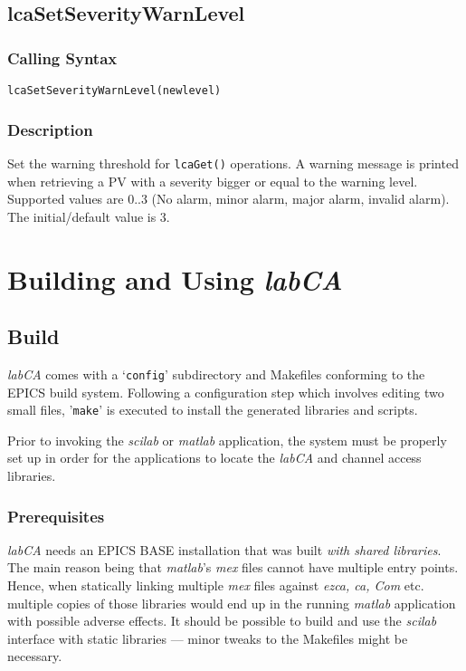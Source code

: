 \documentclass{article}
\newcommand{\sca}{\ita{labCA}}
\newcommand{\scilab}{\ita{scilab}}
\newcommand{\matlab}{\ita{matlab}}
\newcommand{\com}[1]{{\tt #1}}
\newcommand{\ita}[1]{\emph{#1}}
\newcommand{\sevrange}{$0..3$}
\renewcommand{\sevrange}{0..3}
\begin{document}
\subsection{lcaSetSeverityWarnLevel}
\label{swarnlevel}
\subsubsection{Calling Syntax}
\begin{verbatim}
lcaSetSeverityWarnLevel(newlevel)
\end{verbatim}
\subsubsection{Description}
Set the warning threshold for \com{lcaGet()} operations.
A warning message is printed when retrieving a PV with a severity bigger
or equal to the warning level. Supported values are \sevrange{} (No alarm,
minor alarm, major alarm, invalid alarm). The initial/default value is 3.

\section{Building and Using \sca{}}
\subsection{Build}
\sca{} comes with a `\com{config}' subdirectory and Makefiles conforming to the
EPICS build system. Following a configuration step which involves editing
two small files, '\com{make}' is executed to install the generated libraries
and scripts.

Prior to invoking the \scilab{} or \matlab{} application, the system
must be properly set up in order for the applications to locate the
\sca{} and channel access libraries.

\subsubsection{Prerequisites}
\sca{} needs an EPICS BASE installation that was built \ita{with shared
libraries}. The main reason being that \matlab's \ita{mex} files cannot
have multiple entry points. Hence, when statically linking multiple \ita{mex}
files against \ita{ezca, ca, Com} etc. multiple copies of those libraries
would end up in the running \matlab{} application with possible adverse
effects. It should be possible to build and use the \scilab{} interface
with static libraries --- minor tweaks to the Makefiles might be necessary.
\end{document}
